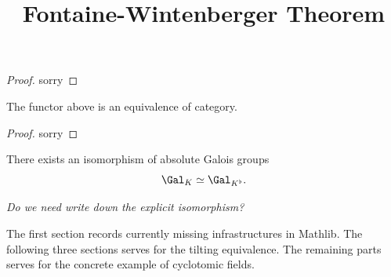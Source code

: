 \begin{proof}
    \notready

    sorry
\end{proof}

\begin{theorem}
    \label{tilting_finite_equivalence_of_category}
    \notready

    The functor above is an equivalence of category.
\end{theorem}

\begin{proof}
    \notready

    sorry
\end{proof}

\begin{definition}
    \label{Galois Isomorphism of Perfectoid Fields}

    \notready

    There exists an isomorphism of absolute Galois groups
    $$ \Gal_K \simeq \Gal_{K^\flat}.$$

    \emph{Do we need write down the explicit isomorphism?}
\end{definition}


\title{Fontaine-Wintenberger Theorem}




\maketitle


\tableofcontents

The first section records currently missing infrastructures in Mathlib. The following three sections serves for the tilting equivalence. The remaining parts serves for the concrete example of cyclotomic fields.





